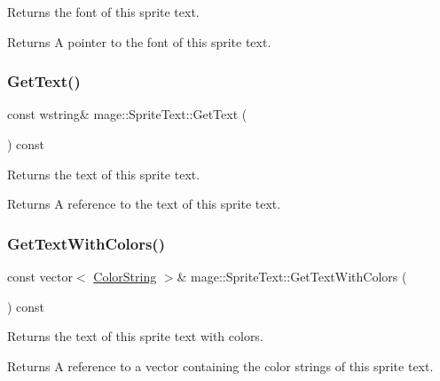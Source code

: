 Returns the font of this sprite text.

\begin{DoxyReturn}{Returns}
A pointer to the font of this sprite text. 
\end{DoxyReturn}
\hypertarget{classmage_1_1_sprite_text_adf93f6290fb55685aee478255e88792e}{}\label{classmage_1_1_sprite_text_adf93f6290fb55685aee478255e88792e} 
\subsubsection{\texorpdfstring{Get\+Text()}{GetText()}}
{\footnotesize\ttfamily const wstring\& mage\+::\+Sprite\+Text\+::\+Get\+Text (\begin{DoxyParamCaption}{ }\end{DoxyParamCaption}) const\hspace{0.3cm}{\ttfamily [noexcept]}}

Returns the text of this sprite text.

\begin{DoxyReturn}{Returns}
A reference to the text of this sprite text. 
\end{DoxyReturn}
\hypertarget{classmage_1_1_sprite_text_a2493ad5e9a8c472dae8beb92f51dc882}{}\label{classmage_1_1_sprite_text_a2493ad5e9a8c472dae8beb92f51dc882} 
\subsubsection{\texorpdfstring{Get\+Text\+With\+Colors()}{GetTextWithColors()}}
{\footnotesize\ttfamily const vector$<$ \hyperlink{classmage_1_1_color_string}{Color\+String} $>$\& mage\+::\+Sprite\+Text\+::\+Get\+Text\+With\+Colors (\begin{DoxyParamCaption}{ }\end{DoxyParamCaption}) const\hspace{0.3cm}{\ttfamily [noexcept]}}

Returns the text of this sprite text with colors.

\begin{DoxyReturn}{Returns}
A reference to a vector containing the color strings of this sprite text. 
\end{DoxyReturn}
\hypertarget{classmage_1_1_sprite_text_af027a281c1fa600dd870ca04d91fcae8}{}\label{classmage_1_1_sprite_text_af027a281c1fa600dd870ca04d91fcae8} 
